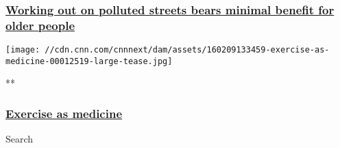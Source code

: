 \hypertarget{working-out-on-polluted-streets-bears-minimal-benefit-for-older-people}{%
\subsubsection{\texorpdfstring{\href{/2017/12/05/health/exercise-polluted-urban-streets-intl/index.html}{Working
out on polluted streets bears minimal benefit for older
people}}{Working out on polluted streets bears minimal benefit for older people}}\label{working-out-on-polluted-streets-bears-minimal-benefit-for-older-people}}

\href{/videos/living/2016/02/09/exercise-as-medicine.cnn}{}

\texttt{[image: //cdn.cnn.com/cnnnext/dam/assets/160209133459-exercise-as-medicine-00012519-large-tease.jpg]}

**

\hypertarget{exercise-as-medicine}{%
\subsubsection{\texorpdfstring{\href{/videos/living/2016/02/09/exercise-as-medicine.cnn}{Exercise
as medicine}}{Exercise as medicine}}\label{exercise-as-medicine}}

Search

